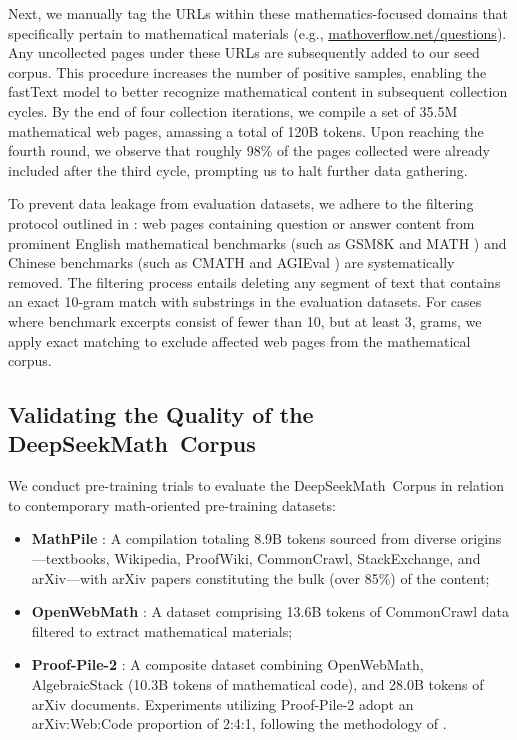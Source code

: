 Next, we manually tag the URLs within these mathematics-focused domains that specifically pertain to mathematical materials (e.g., \url{mathoverflow.net/questions}). Any uncollected pages under these URLs are subsequently added to our seed corpus. This procedure increases the number of positive samples, enabling the fastText model to better recognize mathematical content in subsequent collection cycles. By the end of four collection iterations, we compile a set of 35.5M mathematical web pages, amassing a total of 120B tokens. Upon reaching the fourth round, we observe that roughly 98\% of the pages collected were already included after the third cycle, prompting us to halt further data gathering.

To prevent data leakage from evaluation datasets, we adhere to the filtering protocol outlined in \cite{deepseek-coder}: web pages containing question or answer content from prominent English mathematical benchmarks (such as GSM8K \citep{gsm8k} and MATH \citep{MATH}) and Chinese benchmarks (such as CMATH \citep{wei2023cmath} and AGIEval \citep{agieval}) are systematically removed. The filtering process entails deleting any segment of text that contains an exact 10-gram match with substrings in the evaluation datasets. For cases where benchmark excerpts consist of fewer than 10, but at least 3, grams, we apply exact matching to exclude affected web pages from the mathematical corpus.

\subsection{Validating the Quality of the DeepSeekMath~Corpus}

We conduct pre-training trials to evaluate the DeepSeekMath~Corpus in relation to contemporary math-oriented pre-training datasets:

\begin{itemize}[topsep=0pt]
    \item \textbf{MathPile} \citep{mathpile}: A compilation totaling 8.9B tokens sourced from diverse origins—textbooks, Wikipedia, ProofWiki, CommonCrawl, StackExchange, and arXiv—with arXiv papers constituting the bulk (over 85\%) of the content;
    \item \textbf{OpenWebMath} \citep{openwebmath}: A dataset comprising 13.6B tokens of CommonCrawl data filtered to extract mathematical materials;
    \item \textbf{Proof-Pile-2} \citep{llemma}: A composite dataset combining OpenWebMath, AlgebraicStack (10.3B tokens of mathematical code), and 28.0B tokens of arXiv documents. Experiments utilizing Proof-Pile-2 adopt an arXiv:Web:Code proportion of 2:4:1, following the methodology of \cite{llemma}.
\end{itemize}

